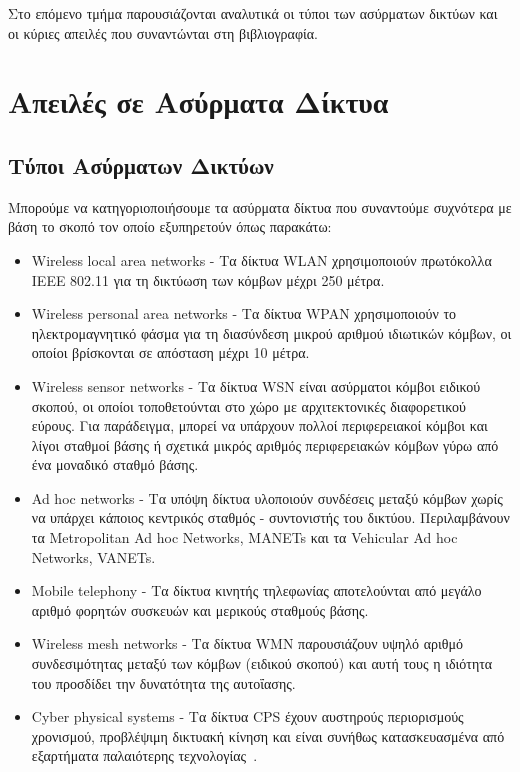 \documentclass[12pt]{report}
\begin{document}
Στο επόμενο τμήμα παρουσιάζονται αναλυτικά οι τύποι των ασύρματων δικτύων και οι κύριες απειλές που συναντώνται στη βιβλιογραφία.

\chapter{Απειλές σε Ασύρματα Δίκτυα}
\section{Τύποι Ασύρματων Δικτύων}
Μπορούμε να κατηγοριοποιήσουμε τα ασύρματα δίκτυα που συναντούμε συχνότερα με βάση το σκοπό τον οποίο εξυπηρετούν όπως παρακάτω:
\begin{itemize}
  \item \textlatin{Wireless local area networks} - Τα δίκτυα \textlatin{WLAN} χρησιμοποιούν πρωτόκολλα \textlatin{IEEE 802.11} για τη δικτύωση των κόμβων μέχρι 250 μέτρα.
  \item \textlatin{Wireless personal area networks} - Τα δίκτυα \textlatin{WPAN} χρησιμοποιούν το ηλεκτρομαγνητικό φάσμα για τη διασύνδεση μικρού αριθμού ιδιωτικών κόμβων, οι οποίοι βρίσκονται σε απόσταση μέχρι 10 μέτρα.
  \item \textlatin{Wireless sensor networks} - Τα δίκτυα \textlatin{WSN} είναι ασύρματοι κόμβοι ειδικού σκοπού, οι οποίοι τοποθετούνται στο χώρο με αρχιτεκτονικές διαφορετικού εύρους. Για παράδειγμα, μπορεί να υπάρχουν πολλοί περιφερειακοί κόμβοι και λίγοι σταθμοί βάσης ή σχετικά μικρός αριθμός περιφερειακών κόμβων γύρω από ένα μοναδικό σταθμό βάσης.
  \item \textlatin{Ad hoc networks} - Τα υπόψη δίκτυα υλοποιούν συνδέσεις μεταξύ κόμβων χωρίς να υπάρχει κάποιος κεντρικός σταθμός - συντονιστής του δικτύου. Περιλαμβάνουν τα \textlatin{Metropolitan Ad hoc Networks, MANETs} και τα \textlatin{Vehicular Ad hoc Networks, VANETs}.
  \item \textlatin{Mobile telephony} - Τα δίκτυα κινητής τηλεφωνίας αποτελούνται από μεγάλο αριθμό φορητών συσκευών και μερικούς σταθμούς βάσης.
  \item \textlatin{Wireless mesh networks} - Τα δίκτυα \textlatin{WMN} παρουσιάζουν υψηλό αριθμό συνδεσιμότητας μεταξύ των κόμβων (ειδικού σκοπού) και αυτή τους η ιδιότητα του προσδίδει την δυνατότητα της αυτοΐασης.
  \item \textlatin{Cyber physical systems} - Τα δίκτυα \textlatin{CPS} έχουν αυστηρούς περιορισμούς χρονισμού, προβλέψιμη δικτυακή κίνηση και είναι συνήθως κατασκευασμένα από εξαρτήματα παλαιότερης τεχνολογίας~\cite{paper:12}.
\end{itemize}
\end{document}
